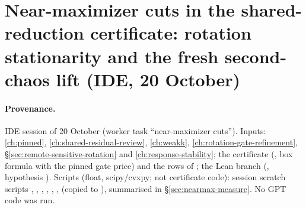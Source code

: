 \section{Near-maximizer cuts in the shared-reduction certificate: rotation stationarity and the fresh second-chaos lift (IDE, 20 October)}\label{ch:nearmax}

\paragraph{Provenance.} IDE session of 20 October (worker task ``near-maximizer cuts''). Inputs: \autoref{ch:pinned}, \autoref{ch:shared-residual-review}, \autoref{ch:weakk},
\autoref{ch:rotation-gate-refinement}, \S\ref{sec:remote-sensitive-rotation} and \autoref{ch:response-stability}; the certificate 
(, box formula with the pinned gate price) and the rows of ; the Lean branch  (,
hypothesis ). Scripts (float, scipy/cvxpy; not certificate code): session scratch scripts , , , , , ,  (copied to ),
summarised in \S\ref{sec:nearmax-measure}. No GPT code was run.

